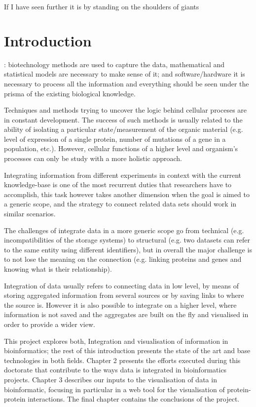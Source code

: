 \begin{savequote}[75mm] 
If I have seen further it is by standing on the shoulders of giants
\end{savequote}

\chapter{Introduction}

: biotechnology methods are used to capture the data, mathematical and statistical models are necessary to make sense of it; and software/hardware it is necessary to process all the information and everything should be seen under the prisma of the existing biological knowledge.

Techniques and methods trying to uncover the logic behind cellular proceses are in constant development. The success of such methods is usually related to the ability of isolating a particular state/measurement of the organic material (e.g. level of expression of a single protein, number of mutations of a gene in a population, etc.). However,  cellular functions of a higher level and organism's processes can only be study with a more holistic approach.

Integrating information from different experiments in context with the current knowledge-base is one of the most recurrent duties that researchers have to accomplish, this task however takes another dimension when the goal is aimed to a generic scope, and the strategy to connect related data sets should work in similar scenarios.

The challenges of integrate data in a more generic scope go from technical (e.g. incompatibilities of the storage systems) to structural (e.g. two datasets can refer to the same entity using different identifiers), but in overall the major challenge is to not lose the meaning on the connection (e.g. linking proteins and genes and knowing what is their relationship).

Integration of data usually refers to connecting data in low level, by means of storing aggregated information from several sources or by saving links to where the source is. However it is also possible to integrate on a higher level, where information is not saved and the aggregates are built on the fly and visualised in order to provide a wider view.

This project explores both, Integration and visualisation of information in bioinformatics; the rest of this introduction presents the state of the art and base technologies in both fields. Chapter 2 presents the efforts executed during this doctorate that contribute to the ways data is integrated in bioinformatics projects. Chapter 3 describes our inputs to the visualisation of data in bioinformatic, focusing in particular in a web tool for the visualisation of protein-protein interactions. The final chapter contains the conclusions of the project.


